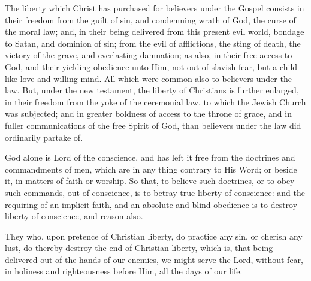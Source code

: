 \begin{outerlst}[left=0pt,labelsep=0pt]
\begin{innerlst}[resume*]
\item The liberty which Christ has purchased for believers under the Gospel consists in their freedom from the guilt of sin, and condemning wrath of God, the curse of the moral law; and, in their being delivered from this present evil world, bondage to Satan, and dominion of sin; from the evil of afflictions, the sting of death, the victory of the grave, and everlasting damnation; as also, in their free access to God, and their yielding obedience unto Him, not out of slavish fear, but a child-like love and willing mind. All which were common also to believers under the law. But, under the new testament, the liberty of Christians is further enlarged, in their freedom from the yoke of the ceremonial law, to which the Jewish Church was subjected; and in greater boldness of access to the throne of grace, and in fuller communications of the free Spirit of God, than believers under the law did ordinarily partake of.   

\item God alone is Lord of the conscience, and has left it free from the doctrines and commandments of men, which are in any thing contrary to His Word; or beside it, in matters of faith or worship. So that, to believe such doctrines, or to obey such commands, out of conscience, is to betray true liberty of conscience: and the requiring of an implicit faith, and an absolute and blind obedience is to destroy liberty of conscience, and reason also.   

\item They who, upon pretence of Christian liberty, do practice any sin, or cherish any lust, do thereby destroy the end of Christian liberty, which is, that being delivered out of the hands of our enemies, we might serve the Lord, without fear, in holiness and righteousness before Him, all the days of our life.   


\end{innerlst}
\end{outerlst}
